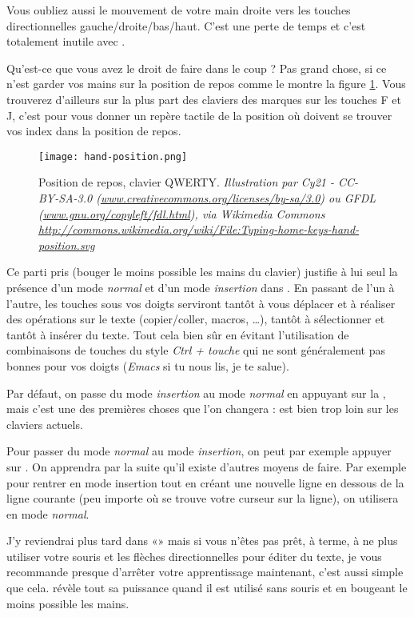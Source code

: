 Vous oubliez aussi le mouvement de votre main droite vers les touches directionnelles gauche/droite/bas/haut. C'est une perte de temps et c'est totalement inutile avec \vim.

Qu'est-ce que vous avez le droit de faire dans le coup ? Pas grand chose, si ce n'est garder vos mains sur la position de repos comme le montre la figure \ref{fig:hand-position}. Vous trouverez d'ailleurs sur la plus part des claviers des marques sur les touches F et J, c'est pour vous donner un repère tactile de la position où doivent se trouver vos index dans la position de repos.

\begin{figure}%
  \texttt{[image: hand-position.png]}
  \caption{Position de repos, clavier QWERTY. \emph{Illustration par Cy21 - CC-BY-SA-3.0 (\url{www.creativecommons.org/licenses/by-sa/3.0}) ou GFDL (\url{www.gnu.org/copyleft/fdl.html}), via Wikimedia Commons \url{http://commons.wikimedia.org/wiki/File:Typing-home-keys-hand-position.svg}}}
  \label{fig:hand-position}
\end{figure}

Ce parti pris (bouger le moins possible les mains du clavier) justifie à lui seul la présence d'un mode \emph{normal} et d'un mode \emph{insertion} dans \vim. En passant de l'un à l'autre, les touches sous vos doigts serviront tantôt à vous déplacer et à réaliser des opérations sur le texte (copier/coller, macros, \ldots), tantôt à sélectionner et tantôt à insérer du texte. Tout cela bien sûr en évitant l'utilisation de combinaisons de touches du style \emph{Ctrl + touche} qui ne sont généralement pas bonnes pour vos doigts (\emph{Emacs} si tu nous lis, je te salue).

Par défaut, on passe du mode \emph{insertion} au mode \emph{normal} en appuyant sur la \ttesc, mais c'est une des premières choses que l'on changera : \ttesc est bien trop loin sur les claviers actuels. 

Pour passer du mode \emph{normal} au mode \emph{insertion}, on peut par exemple appuyer sur \tti. On apprendra par la suite qu'il existe d'autres moyens de faire. Par exemple pour rentrer en mode insertion tout en créant une nouvelle ligne en dessous de la ligne courante (peu importe où se trouve votre curseur sur la ligne), on utilisera \tto en mode \emph{normal}.

J'y reviendrai plus tard dans «» mais si vous n'êtes pas prêt, à terme, à ne plus utiliser votre souris et les flèches directionnelles pour éditer du texte, je vous recommande presque d'arrêter votre apprentissage maintenant, c'est aussi simple que cela. \vim révèle tout sa puissance quand il est utilisé sans souris et en bougeant le moins possible les mains.

